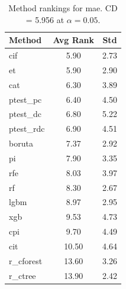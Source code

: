\begin{table}[h]
\centering
\caption{Method rankings for mae. CD = 5.956 at $\alpha=0.05$.}
\label{tab:ranks_mae}
\begin{tabular}{lcc}
\toprule
Method & Avg Rank & Std \\
\midrule
cif & 5.90 & 2.73 \\
et & 5.90 & 2.90 \\
cat & 6.30 & 3.89 \\
ptest_pc & 6.40 & 4.50 \\
ptest_dc & 6.80 & 5.22 \\
ptest_rdc & 6.90 & 4.51 \\
boruta & 7.37 & 2.92 \\
pi & 7.90 & 3.35 \\
rfe & 8.03 & 3.97 \\
rf & 8.30 & 2.67 \\
lgbm & 8.97 & 2.95 \\
xgb & 9.53 & 4.73 \\
cpi & 9.70 & 4.49 \\
cit & 10.50 & 4.64 \\
r_cforest & 13.60 & 3.26 \\
r_ctree & 13.90 & 2.42 \\
\bottomrule
\end{tabular}
\end{table}
